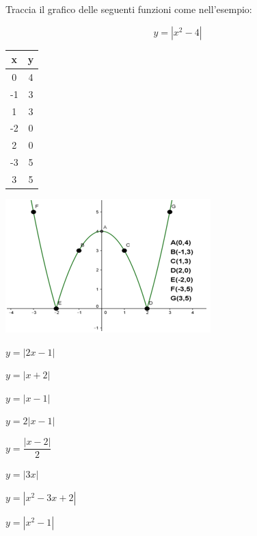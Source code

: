 \begin{esercizio}\label{ese:03.1}
Traccia il grafico delle seguenti funzioni come nell'esempio:

\noindent\begin{minipage}{.40\textwidth}
$$y=|x^2-4|$$
\begin{tabular}{|c|c|}
        \hline
        x & y \\
        \hline
        0 & 4 \\
        \hline  
        -1 & 3 \\
        \hline
        1 & 3 \\
        \hline
        -2 & 0 \\
        \hline
        2 & 0 \\
        \hline
        -3 & 5 \\
        \hline
        3 & 5 \\
        \hline                                                  
\end{tabular} 
\end{minipage}
\hfill
\begin{minipage}{.58\textwidth}
\begin{inaccessibleblock}[TODO]
\centering
\includegraphics[width=0.9\linewidth]{img/imm7} 
\end{inaccessibleblock}
\end{minipage}

\begin{multicols}{4}
\begin{enumeratea}
        \item $y=|2x-1|$
        \item $y=|x+2|$
        \item $y=|x-1|$
        \item $y=2|x-1|$
        \item $y=\dfrac{|x-2|}{2}$
        \item $y=|3x|$
        \item $y=|x^2-3x+2|$
        \item $y=|x^2-1|$
\end{enumeratea}
\end{multicols}
\end{esercizio}

